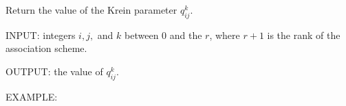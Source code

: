 \documentclass[letterpaper,10pt,english]{sphinxmanual}
\begin{document}
\begin{fulllineitems}
\begin{fulllineitems}
\begin{sphinxVerbatim}[commandchars=\\\{\}]
   
   
   
   
   \PYG{p}{[}\PYG{p}{]}
 
\end{sphinxVerbatim}

\end{fulllineitems}


\begin{fulllineitems}
\label{\detokenize{AssociationSchemes.generic_schemes:AssociationSchemes.generic_schemes.AssociationScheme.krein_parameters}}
\pysigstartsignatures
\pysiglinewithargsret
{}
{\sphinxparamcomma {}\sphinxparamcomma {}}
{}
\pysigstopsignatures
\sphinxAtStartPar
Return the value of the Krein parameter \(q_{ij}^k\).

\sphinxAtStartPar
INPUT: integers \(i,j,\) and \(k\) between \(0\) and the \(r\), where \(r+1\) is the rank of the association scheme.

\sphinxAtStartPar
OUTPUT: the value of \(q_{ij}^k\).

\sphinxAtStartPar
EXAMPLE:


\end{fulllineitems}
\end{fulllineitems}
\end{document}
